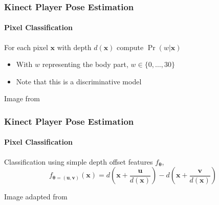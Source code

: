 \documentclass[xetex,professionalfont]{beamer}
\renewcommand{\vec}[1]{\ensuremath{\mathbf{#1}}}
\newcommand{\vu}{\vec{u}}
\newcommand{\vv}{\vec{v}}
\newcommand{\vx}{\vec{x}}
\newcommand{\bth}{\boldsymbol{\theta}}
\begin{document}
\begin{frame}
\frametitle{Kinect Player Pose Estimation}
\framesubtitle{Pixel Classification}

For each pixel $\vx$ with depth $d(\vx)$ compute $\Pr(w|\vx)$ %
\begin{itemize}
     \item With $w$ representing the body part, $w\in\{0,\dots,30\}$ %
     \item Note that this is a discriminative model %
\end{itemize} 

\bigskip
\begin{center}
    {\centering Image from \cite{shotton2011}}
\end{center}

\end{frame}


\begin{frame}
\frametitle{Kinect Player Pose Estimation}
\framesubtitle{Pixel Classification}

Classification using simple depth offset features $f_{\bth}$,
\[
    f_{\bth=(\vu,\vv)}(\vx)=d\left(\vx+\frac{\vu}{d(\vx)}\right)-d\left(\vx+\frac{\vv}{d(\vx)}\right)
\] %

\smallskip
\begin{center}
    {\centering Image adapted from \cite{shotton2011}} %
\end{center}

\end{frame}
\end{document}

